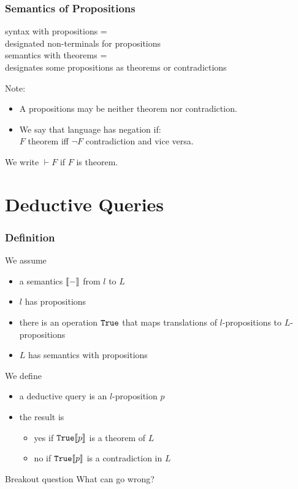 \begin{frame}\frametitle{Semantics of Propositions}
syntax with propositions = \\
designated non-terminals for propositions \\
semantics with theorems = \\
designates some propositions as theorems or contradictions

Note:
\begin{itemize}
\item A propositions may be neither theorem nor contradiction.
\item We say that language has negation if:\\ $F$ theorem iff $\neg F$ contradiction and vice versa.
\end{itemize}

We write $\vdash F$ if $F$ is theorem.
\end{frame}

\section{Deductive Queries}

\begin{frame}\frametitle{Definition}
We assume
\begin{itemize}
\item a semantics $\llbracket -\rrbracket$ from $l$ to $L$
\item $l$ has propositions
\item there is an operation $\mathtt{True}$ that maps translations of $l$-propositions to $L$-propositions
\item $L$ has semantics with propositions
\end{itemize}

We define
\begin{itemize}
\item a deductive query is an $l$-proposition $p$
\item the result is
 \begin{itemize}
 \item yes if $\mathtt{True} \llbracket p\rrbracket$ is a theorem of $L$
 \item no if $\mathtt{True} \llbracket p\rrbracket$ is a contradiction in $L$
 \end{itemize}
\end{itemize}
\end{frame}

\begin{frame}{Breakout question}
What can go wrong?
\end{frame}

